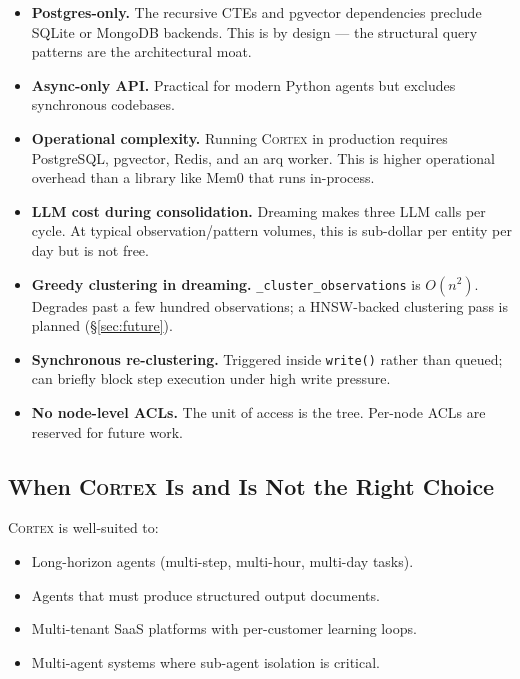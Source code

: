 \documentclass[11pt,a4paper]{article}
\theoremstyle{cortexprop}
\newcommand{\code}[1]{\texttt{#1}}
\begin{document}
\begin{itemize}
  \item \textbf{Postgres-only.} The recursive CTEs and pgvector
  dependencies preclude SQLite or MongoDB backends. This is by design ---
  the structural query patterns are the architectural moat.

  \item \textbf{Async-only API.} Practical for modern Python agents but
  excludes synchronous codebases.

  \item \textbf{Operational complexity.} Running \textsc{Cortex} in
  production requires PostgreSQL, pgvector, Redis, and an arq worker.
  This is higher operational overhead than a library like Mem0 that runs
  in-process.

  \item \textbf{LLM cost during consolidation.} Dreaming makes three LLM
  calls per cycle. At typical observation/pattern volumes, this is
  sub-dollar per entity per day but is not free.

  \item \textbf{Greedy clustering in dreaming.}
  \code{\_cluster\_observations} is $O(n^2)$. Degrades past a few hundred
  observations; a HNSW-backed clustering pass is planned
  (\S\ref{sec:future}).

  \item \textbf{Synchronous re-clustering.} Triggered inside
  \code{write()} rather than queued; can briefly block step execution
  under high write pressure.

  \item \textbf{No node-level ACLs.} The unit of access is the tree.
  Per-node ACLs are reserved for future work.
\end{itemize}

\subsection{When \textsc{Cortex} Is and Is Not the Right Choice}

\textsc{Cortex} is well-suited to:

\begin{itemize}
  \item Long-horizon agents (multi-step, multi-hour, multi-day tasks).
  \item Agents that must produce structured output documents.
  \item Multi-tenant SaaS platforms with per-customer learning loops.
  \item Multi-agent systems where sub-agent isolation is critical.
\end{itemize}
\end{document}
